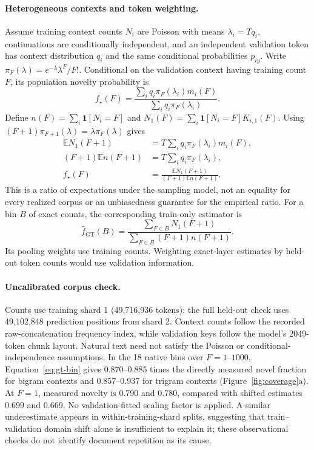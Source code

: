 \paragraph{Heterogeneous contexts and token weighting.}
Assume training context counts $N_i$ are Poisson with means $\lambda_i=Tq_i$, continuations are conditionally independent, and an independent validation token has context distribution $q_i$ and the same conditional probabilities $p_{iy}$. Write $\pi_F(\lambda)=e^{-\lambda}\lambda^F/F!$. Conditional on the validation context having training count $F$, its population novelty probability is
\begin{equation}
f_\star(F)=\frac{\sum_i q_i\pi_F(\lambda_i)m_i(F)}{\sum_i q_i\pi_F(\lambda_i)}.
\end{equation}
Define $n(F)=\sum_i\mathbf1[N_i=F]$ and $N_1(F)=\sum_i\mathbf1[N_i=F]K_{i,1}(F)$. Using $(F+1)\pi_{F+1}(\lambda)=\lambda\pi_F(\lambda)$ gives
\begin{equation}
\begin{aligned}
\mathbb E N_1(F+1)&=T\sum_i q_i\pi_F(\lambda_i)m_i(F),\\
(F+1)\mathbb E n(F+1)&=T\sum_i q_i\pi_F(\lambda_i),\\
f_\star(F)&=\frac{\mathbb E N_1(F+1)}{(F+1)\mathbb E n(F+1)}.
\end{aligned}
\label{eq:gt-poisson}
\end{equation}
This is a ratio of expectations under the sampling model, not an equality for every realized corpus or an unbiasedness guarantee for the empirical ratio. For a bin $B$ of exact counts, the corresponding train-only estimator is
\begin{equation}
\widehat f_{\mathrm{GT}}(B)=\frac{\sum_{F\in B}N_1(F+1)}{\sum_{F\in B}(F+1)n(F+1)}.
\label{eq:gt-bin}
\end{equation}
Its pooling weights use training counts. Weighting exact-layer estimates by held-out token counts would use validation information.

\paragraph{Uncalibrated corpus check.}
Counts use training shard 1 (49,716,936 tokens); the full held-out check uses 49,102,848 prediction positions from shard 2. Context counts follow the recorded raw-concatenation frequency index, while validation keys follow the model's 2049-token chunk layout. Natural text need not satisfy the Poisson or conditional-independence assumptions. In the 18 native bins over $F=1$--$1000$, Equation~\eqref{eq:gt-bin} gives 0.870--0.885 times the directly measured novel fraction for bigram contexts and 0.857--0.937 for trigram contexts (Figure~\ref{fig:coverage}a). At $F=1$, measured novelty is 0.790 and 0.780, compared with shifted estimates 0.699 and 0.669. No validation-fitted scaling factor is applied. A similar underestimate appears in within-training-shard splits, suggesting that train--validation domain shift alone is insufficient to explain it; these observational checks do not identify document repetition as its cause.

